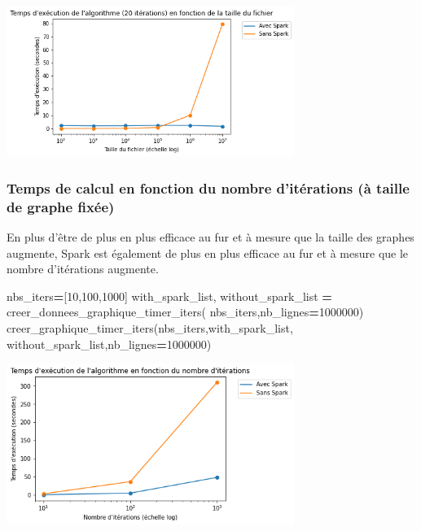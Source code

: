 \documentclass[10pt,a4paper]{article}
\newenvironment{Shaded}{\begin{snugshade}}{\end{snugshade}}
\newcommand{\DecValTok}[1]{\textcolor[rgb]{0.00,0.00,0.81}{#1}}
\newcommand{\NormalTok}[1]{#1}
\newcommand{\OperatorTok}[1]{\textcolor[rgb]{0.81,0.36,0.00}{\textbf{#1}}}
\theoremstyle{break}
\begin{document}
\begin{center}
\includegraphics[width=0.7\textwidth]{img/DocPageRank_files/DocPageRank_37_0.png}
\end{center}

\hypertarget{temps-de-calcul-en-fonction-du-nombre-dituxe9rations-uxe0-taille-de-graphe-fixuxe9e}{%
\subsubsection{Temps de calcul en fonction du nombre d'itérations (à taille de graphe fixée)}\label{temps-de-calcul-en-fonction-du-nombre-dituxe9rations-uxe0-taille-de-graphe-fixuxe9e}}

En plus d'être de plus en plus efficace au fur et à mesure que la taille des graphes augmente, Spark est également de plus en plus efficace au fur et à mesure que le nombre d'itérations augmente.

\begin{Shaded}
\begin{Highlighting}[]
\NormalTok{nbs_iters}\OperatorTok{=}\NormalTok{[}\DecValTok{10}\NormalTok{,}\DecValTok{100}\NormalTok{,}\DecValTok{1000}\NormalTok{]}
\NormalTok{with_spark_list, without_spark_list }\OperatorTok{=}\NormalTok{ creer_donnees_graphique_timer_iters(}
\NormalTok{    nbs_iters,nb_lignes}\OperatorTok{=}\DecValTok{1000000}\NormalTok{)}
\NormalTok{creer_graphique_timer_iters(nbs_iters,with_spark_list,}
\NormalTok{                            without_spark_list,nb_lignes}\OperatorTok{=}\DecValTok{1000000}\NormalTok{)}
\end{Highlighting}
\end{Shaded}

\begin{center}
\includegraphics[width=0.7\textwidth]{img/DocPageRank_files/DocPageRank_39_0.png}
\end{center}
\end{document}
